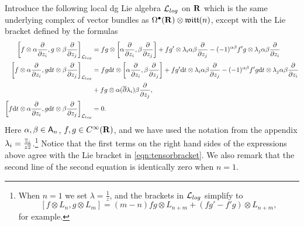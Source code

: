 \documentclass[11pt]{amsart}
\begin{document}
Introduce the following local dg Lie algebra $\mathcal L_{log}$ on $\mathbf{R}$ which is the same underlying complex of vector bundles as $\Omega^\bullet (\mathbf{R}) \otimes  \mathfrak{witt}(n)$, except with the Lie bracket defined by the formulas
\begin{align*}
\left[f \otimes \alpha \frac{\partial}{\partial z_i} , g \otimes \beta \frac{\partial}{\partial z_j}\right]_{\mathcal L_{log}} & = fg \otimes \left[\alpha \frac{\partial}{\partial z_i}, \beta \frac{\partial}{\partial z_j}\right] +  f g' \otimes \lambda_i \alpha \beta \frac{\partial}{\partial z_j} - (-1)^{\alpha \beta} f' g \otimes \lambda_j \alpha \beta  \frac{\partial}{\partial z_i}  \\
\left[f \otimes \alpha \frac{\partial}{\partial z_i} , g {\rm d} t \otimes \beta \frac{\partial}{\partial z_j}\right]_{\mathcal L_{log}} & = fg {\rm d} t \otimes \left[\alpha \frac{\partial}{\partial z_i}, \beta \frac{\partial}{\partial z_j}\right] + f g' {\rm d} t \otimes \lambda_i \alpha \beta \frac{\partial}{\partial z_j} - (-1)^{\alpha \beta} f' g {\rm d} t \otimes \lambda_j \alpha \beta  \frac{\partial}{\partial z_i} \\
& + fg \otimes \alpha (\overline{\partial} \lambda_i) \beta \frac{\partial}{\partial z_j} , \\ 
\left[f {\rm d} t \otimes \alpha \frac{\partial}{\partial z_i} , g {\rm d} t \otimes \beta \frac{\partial}{\partial z_j}\right]_{\mathcal L_{log}} & = 0 .
\end{align*}
Here $\alpha, \beta \in \mathsf A_n$, $f,g \in C^\infty(\mathbf{R})$, and we have used the notation from the appendix $\lambda_i = \frac{{\overline{z}}_i}{z {\overline{z}}}$.\footnote{When $n=1$ we set $\lambda = \frac{1}{z}$, and the brackets in $\mathcal L_{log}$ simplify to
\[
[f \otimes L_n, g \otimes L_m ] = (m-n) fg \otimes L_{n+m} + (fg' - f'g) \otimes L_{n+m} ,
\] 
for example.  }
Notice that the first terms on the right hand sides of the expressions above agree with the Lie bracket in \eqref{eqn:tensorbracket}.
We also remark that the second line of the second equation is identically zero when $n = 1$.
\end{document}
